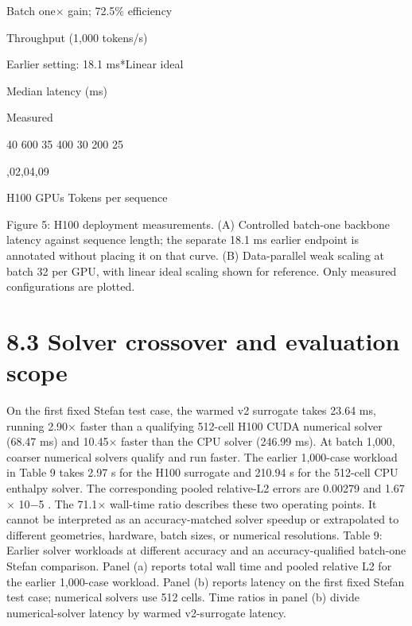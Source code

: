 \documentclass[11pt]{article}
\begin{document}
\noindent Batch one\ensuremath{\times} gain; 72.5\% efficiency\par





Throughput (1,000 tokens/s)

\par


\noindent Earlier setting: 18.1 ms*\quad Linear ideal\par





Median latency (ms)

\quad Measured\par


40
600
35
400
30
200
25


\par


\par


\quad ,02\quad ,04\quad ,09\par

H100 GPUs
Tokens per sequence




Figure 5: H100 deployment measurements. (A) Controlled batch-one backbone latency against
sequence length; the separate 18.1 ms earlier endpoint is annotated without placing it on that curve.
(B) Data-parallel weak scaling at batch 32 per GPU, with linear ideal scaling shown for reference.
Only measured configurations are plotted.

\section*{8.3 Solver crossover and evaluation scope}

On the first fixed Stefan test case, the warmed v2 surrogate takes 23.64 ms, running 2.90\ensuremath{\times}
faster than a qualifying 512-cell H100 CUDA numerical solver (68.47 ms) and 10.45\ensuremath{\times}
faster than the CPU solver (246.99 ms). At batch 1,000, coarser numerical solvers qualify
and run faster.
The earlier 1,000-case workload in Table 9 takes 2.97 s for the H100 surrogate and 210.94
s for the 512-cell CPU enthalpy solver. The corresponding pooled relative-L2 errors are
0.00279 and 1.67 \ensuremath{\times} 10\ensuremath{-}5 . The 71.1\ensuremath{\times} wall-time ratio describes these two operating points.
It cannot be interpreted as an accuracy-matched solver speedup or extrapolated to different
geometries, hardware, batch sizes, or numerical resolutions.
Table 9: Earlier solver workloads at different accuracy and an accuracy-qualified batch-one Stefan
comparison. Panel (a) reports total wall time and pooled relative L2 for the earlier 1,000-case
workload. Panel (b) reports latency on the first fixed Stefan test case; numerical solvers use 512
cells. Time ratios in panel (b) divide numerical-solver latency by warmed v2-surrogate latency.
\end{document}
